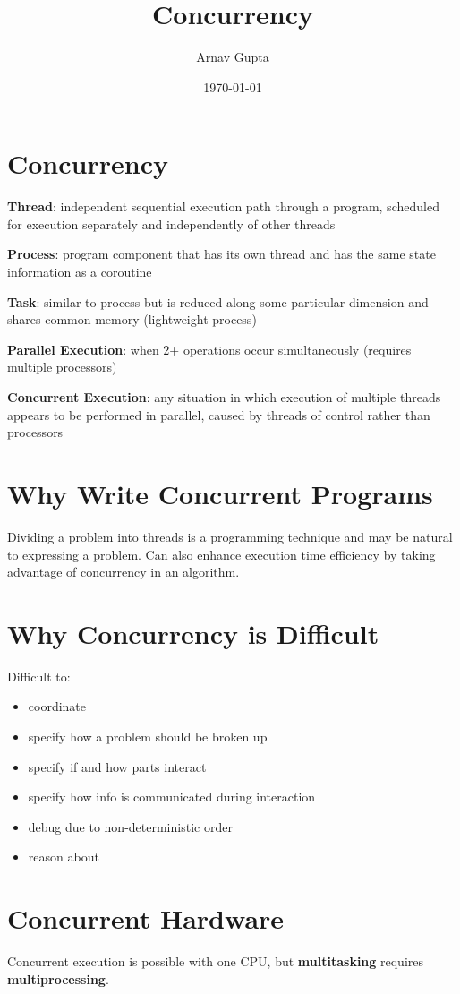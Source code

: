 \documentclass[11pt]{article}
\author{Arnav Gupta}
\date{\today}
\title{Concurrency}
\begin{document}
\maketitle
\tableofcontents

\section{Concurrency}
\label{sec:org2d582ca}
\textbf{Thread}: independent sequential execution path through a program, scheduled for execution separately
and independently of other threads

\textbf{Process}: program component that has its own thread and has the same state information as a coroutine

\textbf{Task}: similar to process but is reduced along some particular dimension and shares common memory
(lightweight process)

\textbf{Parallel Execution}: when 2+ operations occur simultaneously (requires multiple processors)

\textbf{Concurrent Execution}: any situation in which execution of multiple threads appears to be performed in
parallel, caused by threads of control rather than processors
\section{Why Write Concurrent Programs}
\label{sec:orge1de106}
Dividing a problem into threads is a programming technique and may be natural to expressing a problem.
Can also enhance execution time efficiency by taking advantage of concurrency in an algorithm.
\section{Why Concurrency is Difficult}
\label{sec:org67b3933}
Difficult to:
\begin{itemize}
\item coordinate
\item specify how a problem should be broken up
\item specify if and how parts interact
\item specify how info is communicated during interaction
\item debug due to non-deterministic order
\item reason about
\end{itemize}
\section{Concurrent Hardware}
\label{sec:org7e6d15c}
Concurrent execution is possible with one CPU, but \textbf{multitasking} requires \textbf{multiprocessing}.
\end{document}
